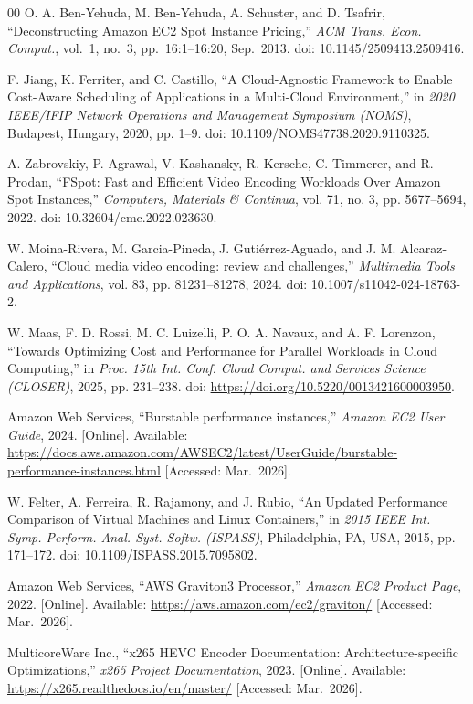 \documentclass[conference]{IEEEtran}
\begin{document}
\begin{thebibliography}{00}
 O. A. Ben-Yehuda, M. Ben-Yehuda, A. Schuster, and D. Tsafrir,
``Deconstructing Amazon EC2 Spot Instance Pricing,''
\emph{ACM Trans. Econ. Comput.}, vol.\ 1, no.\ 3, pp.\ 16:1--16:20, Sep.\ 2013.
doi: 10.1145/2509413.2509416.

 F. Jiang, K. Ferriter, and C. Castillo, ``A Cloud-Agnostic
Framework to Enable Cost-Aware Scheduling of Applications in a Multi-Cloud
Environment,'' in \emph{2020 IEEE/IFIP Network Operations and Management
Symposium (NOMS)}, Budapest, Hungary, 2020, pp. 1--9.
doi: 10.1109/NOMS47738.2020.9110325.

 A. Zabrovskiy, P. Agrawal, V. Kashansky, R. Kersche,
C. Timmerer, and R. Prodan, ``FSpot: Fast and Efficient Video Encoding
Workloads Over Amazon Spot Instances,'' \emph{Computers, Materials \&
Continua}, vol. 71, no. 3, pp. 5677--5694, 2022.
doi: 10.32604/cmc.2022.023630.

 W. Moina-Rivera, M. Garcia-Pineda, J. Gutiérrez-Aguado, and
J. M. Alcaraz-Calero, ``Cloud media video encoding: review and challenges,''
\emph{Multimedia Tools and Applications}, vol. 83, pp. 81231--81278, 2024.
doi: 10.1007/s11042-024-18763-2.

 W. Maas, F. D. Rossi, M. C. Luizelli, P. O. A. Navaux, and
A. F. Lorenzon, ``Towards Optimizing Cost and Performance for Parallel
Workloads in Cloud Computing,'' in \emph{Proc. 15th Int. Conf. Cloud Comput.
and Services Science (CLOSER)}, 2025, pp. 231--238.
doi: \url{https://doi.org/10.5220/0013421600003950}.


 Amazon Web Services, ``Burstable performance instances,''
\emph{Amazon EC2 User Guide}, 2024. [Online]. Available:
\url{https://docs.aws.amazon.com/AWSEC2/latest/UserGuide/burstable-performance-instances.html}
[Accessed: Mar.\ 2026].

 W. Felter, A. Ferreira, R. Rajamony, and J. Rubio,
``An Updated Performance Comparison of Virtual Machines and Linux Containers,''
in \emph{2015 IEEE Int. Symp. Perform. Anal. Syst. Softw. (ISPASS)},
Philadelphia, PA, USA, 2015, pp. 171--172.
doi: 10.1109/ISPASS.2015.7095802.

 Amazon Web Services, ``AWS Graviton3 Processor,''
\emph{Amazon EC2 Product Page}, 2022. [Online]. Available:
\url{https://aws.amazon.com/ec2/graviton/}
[Accessed: Mar.\ 2026].

 MulticoreWare Inc., ``x265 HEVC Encoder Documentation: Architecture-specific Optimizations,''
\emph{x265 Project Documentation}, 2023. [Online]. Available:
\url{https://x265.readthedocs.io/en/master/}
[Accessed: Mar.\ 2026].


\end{thebibliography}
\end{document}
